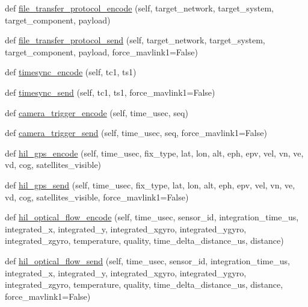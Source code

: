 \begin{DoxyCompactItemize}
\item 
def \hyperlink{classpymavlink_1_1dialects_1_1v10_1_1MAVLink_ad2ebf58a4d5441d54d257f716c2c857b}{file\+\_\+transfer\+\_\+protocol\+\_\+encode} (self, target\+\_\+network, target\+\_\+system, target\+\_\+component, payload)
\item 
def \hyperlink{classpymavlink_1_1dialects_1_1v10_1_1MAVLink_aa07d8bcc43840bafb25b8bc90ef127e5}{file\+\_\+transfer\+\_\+protocol\+\_\+send} (self, target\+\_\+network, target\+\_\+system, target\+\_\+component, payload, force\+\_\+mavlink1=False)
\item 
def \hyperlink{classpymavlink_1_1dialects_1_1v10_1_1MAVLink_ae37c8b3245225c68b6bcdf02ed0a0fdd}{timesync\+\_\+encode} (self, tc1, ts1)
\item 
def \hyperlink{classpymavlink_1_1dialects_1_1v10_1_1MAVLink_a8423566e5cab9696f4fcdbe954c9180c}{timesync\+\_\+send} (self, tc1, ts1, force\+\_\+mavlink1=False)
\item 
def \hyperlink{classpymavlink_1_1dialects_1_1v10_1_1MAVLink_a119ac657ea0b7f8dfd435aa4762eda82}{camera\+\_\+trigger\+\_\+encode} (self, time\+\_\+usec, seq)
\item 
def \hyperlink{classpymavlink_1_1dialects_1_1v10_1_1MAVLink_a0e841249b1bb3bb760759142f96fb489}{camera\+\_\+trigger\+\_\+send} (self, time\+\_\+usec, seq, force\+\_\+mavlink1=False)
\item 
def \hyperlink{classpymavlink_1_1dialects_1_1v10_1_1MAVLink_aed551c29bcfdd9b38040ba83645587f8}{hil\+\_\+gps\+\_\+encode} (self, time\+\_\+usec, fix\+\_\+type, lat, lon, alt, eph, epv, vel, vn, ve, vd, cog, satellites\+\_\+visible)
\item 
def \hyperlink{classpymavlink_1_1dialects_1_1v10_1_1MAVLink_a4ee91a7e40aee7dfd7a92e4888465d0e}{hil\+\_\+gps\+\_\+send} (self, time\+\_\+usec, fix\+\_\+type, lat, lon, alt, eph, epv, vel, vn, ve, vd, cog, satellites\+\_\+visible, force\+\_\+mavlink1=False)
\item 
def \hyperlink{classpymavlink_1_1dialects_1_1v10_1_1MAVLink_af42930cacab6de2d3f8c932d2750eb72}{hil\+\_\+optical\+\_\+flow\+\_\+encode} (self, time\+\_\+usec, sensor\+\_\+id, integration\+\_\+time\+\_\+us, integrated\+\_\+x, integrated\+\_\+y, integrated\+\_\+xgyro, integrated\+\_\+ygyro, integrated\+\_\+zgyro, temperature, quality, time\+\_\+delta\+\_\+distance\+\_\+us, distance)
\item 
def \hyperlink{classpymavlink_1_1dialects_1_1v10_1_1MAVLink_ab7341c8e0c961ea68b30fa5fe74d4077}{hil\+\_\+optical\+\_\+flow\+\_\+send} (self, time\+\_\+usec, sensor\+\_\+id, integration\+\_\+time\+\_\+us, integrated\+\_\+x, integrated\+\_\+y, integrated\+\_\+xgyro, integrated\+\_\+ygyro, integrated\+\_\+zgyro, temperature, quality, time\+\_\+delta\+\_\+distance\+\_\+us, distance, force\+\_\+mavlink1=False)

\end{DoxyCompactItemize}
